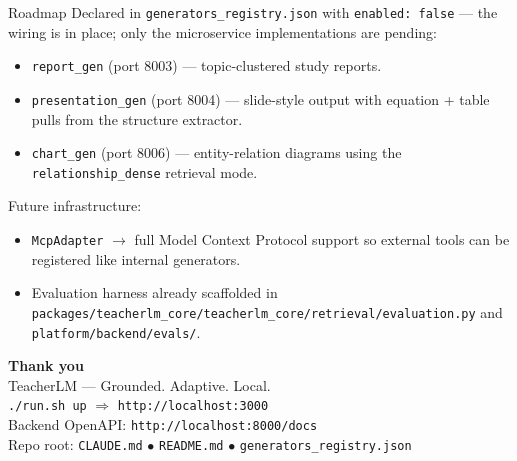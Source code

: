 \documentclass[aspectratio=169, 10pt]{beamer}
\begin{document}
\begin{frame}{Roadmap}
  \scriptsize
  Declared in \texttt{generators\_registry.json} with
  \texttt{enabled: false} --- the wiring is in place; only the
  microservice implementations are pending:
  \begin{itemize}
    \item \texttt{report\_gen} (port 8003) --- topic-clustered study reports.
    \item \texttt{presentation\_gen} (port 8004) --- slide-style output with
          equation + table pulls from the structure extractor.
    \item \texttt{chart\_gen} (port 8006) --- entity-relation diagrams
          using the \texttt{relationship\_dense} retrieval mode.
  \end{itemize}

  Future infrastructure:
  \begin{itemize}
    \item \texttt{McpAdapter} $\to$ full Model Context Protocol support
          so external tools can be registered like internal generators.
    \item Evaluation harness already scaffolded in
          \texttt{packages/teacherlm\_core/teacherlm\_core/retrieval/evaluation.py}
          and \texttt{platform/backend/evals/}.
  \end{itemize}
\end{frame}

\begin{frame}[plain]
  \begin{center}
    {\Huge \color{eduBlue}\textbf{Thank you}}\\[1.2em]
    {\large TeacherLM --- Grounded. Adaptive. Local.}\\[0.6em]
    \scriptsize
    \texttt{./run.sh up} $\Rightarrow$ \texttt{http://localhost:3000}\\
    Backend OpenAPI: \texttt{http://localhost:8000/docs}\\
    Repo root: \texttt{CLAUDE.md} $\bullet$ \texttt{README.md} $\bullet$ \texttt{generators\_registry.json}
  \end{center}
\end{frame}
\end{document}
